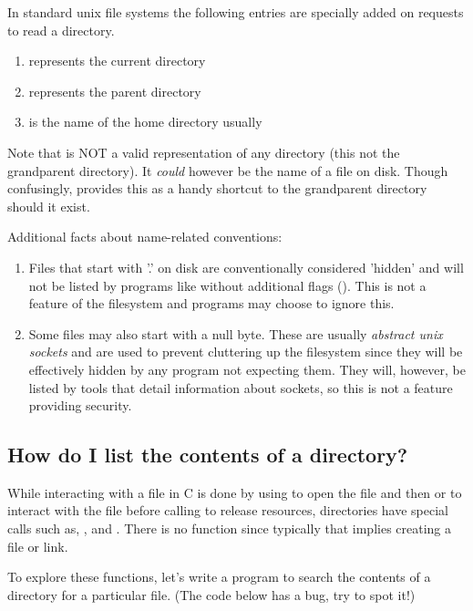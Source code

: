 In standard unix file systems the following entries are specially added on requests to read a directory.

\begin{enumerate}
  \item {} represents the current directory
  \item {} represents the parent directory
  \item \keyword{\~} is the name of the home directory usually
\end{enumerate}

Note that  is NOT a valid representation of any directory (this not the grandparent directory). It \emph{could} however be the name of a file on disk. Though confusingly,  provides this as a handy shortcut to the grandparent directory should it exist.

Additional facts about name-related conventions:
\begin{enumerate}
  \item Files that start with '.' on disk are conventionally considered 'hidden' and will not be listed by programs like  without additional flags (). This is not a feature of the filesystem and programs may choose to ignore this.
  \item Some files may also start with a null byte. These are usually \emph{abstract unix sockets} and are used to prevent cluttering up the filesystem since they will be effectively hidden by any program not expecting them. They will, however, be listed by tools that detail information about sockets, so this is not a feature providing security.
\end{enumerate}

\subsection{How do I list the contents of a directory?}

While interacting with a file in C is done by using  to open the file and then  or  to interact with the file before calling  to release resources, directories have special calls such as, ,  and . There is no function  since typically that implies creating a file or link.

To explore these functions, let's write a program to search the contents of a directory for a particular file. (The code below has a bug, try to spot it!)

